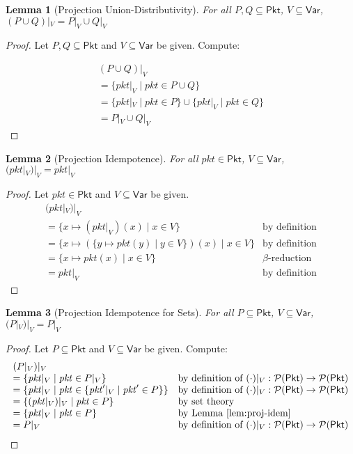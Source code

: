 \documentclass{article}
\newcommand{\pkt}{\mathit{pkt}}
\newcommand{\Pkt}{\mathsf{Pkt}}
\newcommand{\Var}{\mathsf{Var}}
\theoremstyle{plain}
\newtheorem{lemma}{Lemma}
\theoremstyle{definition}
\theoremstyle{remark}
\begin{document}
\begin{lemma}[Projection Union-Distributivity]
  \label{lem:proj-union-set}
  For all $P,Q \subseteq \Pkt$, $V \subseteq \Var$,
  $(P\cup Q)|_V = P|_V \cup Q|_V$
\end{lemma}

\begin{proof}
  Let $P,Q \subseteq \Pkt$ and $V \subseteq \Var$ be given. Compute:

  \[\begin{array}{ll}
  (P\cup Q)|_V\\
  = \{\pkt|_V \mid \pkt \in P\cup Q\}\\
  = \{\pkt|_V \mid \pkt \in P\}\cup \{\pkt|_V \mid \pkt \in Q\}\\
  = P|_V \cup Q|_V
  \end{array}\]
\end{proof}

\begin{lemma}[Projection Idempotence]
  \label{lem:proj-idem}
  For all $\pkt \in \Pkt$, $V \subseteq \Var$,
  $(\pkt|_V)|_V = \pkt|_V$
\end{lemma}

\begin{proof}
  Let $\pkt \in \Pkt$ and $V \subseteq \Var$ be given.
  \[\begin{array}{ll}
    (\pkt|_V)|_V \\
    = \{x \mapsto (\pkt|_V)(x) \mid x \in V\} & \text{by definition}\\
    = \{x \mapsto (\{y \mapsto \pkt(y) \mid y \in V\})(x) \mid x \in V\} & \text{by definition}\\
    = \{x \mapsto \pkt(x) \mid x \in V\} & \beta\text{-reduction}\\
    = \pkt|_V & \text{by definition}
  \end{array}\]
\end{proof}


\begin{lemma}[Projection Idempotence for Sets]
  \label{lem:proj-idem-set}
  For all $P \subseteq \Pkt$, $V \subseteq \Var$,
  $(P|_V)|_V = P|_V$
\end{lemma}

\begin{proof}
  Let $P \subseteq \Pkt$ and $V \subseteq \Var$ be given. Compute:
  \[\begin{array}{ll}
  (P|_V)|_V \\
  = \{\pkt|_V \mid \pkt \in P|_V\}
  & \text{by definition of } (\cdot)|_V : \mathcal{P}(\Pkt) \to \mathcal{P}(\Pkt) \\
  = \{\pkt|_V \mid \pkt \in \{\pkt'|_V \mid \pkt'\in P\}\}
  & \text{by definition of } (\cdot)|_V : \mathcal{P}(\Pkt) \to \mathcal{P}(\Pkt) \\
  = \{(\pkt|_V)|_V \mid \pkt \in P \}
  & \text{by set theory} \\
  = \{\pkt|_V \mid \pkt \in P\} & \text{by Lemma~\ref{lem:proj-idem}} \\
  = P|_V & \text{by definition of } (\cdot)|_V : \mathcal{P}(\Pkt) \to \mathcal{P}(\Pkt)
  \end{array}\]
\end{proof}
\end{document}
